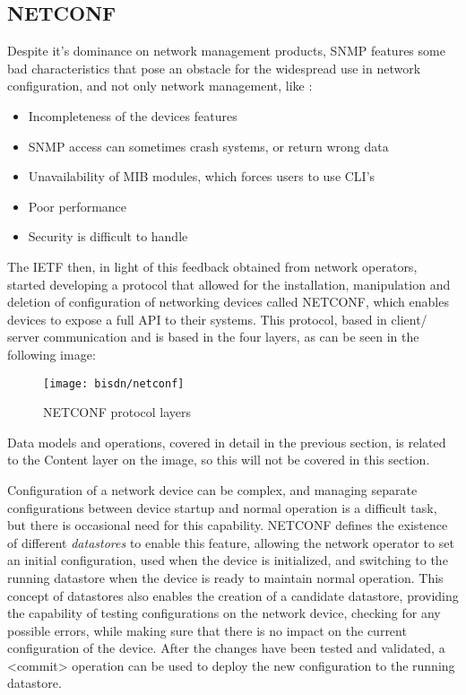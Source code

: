 \subsection {NETCONF} \label {sec:netconf}

Despite it's dominance on network management products, SNMP features some bad characteristics that pose an obstacle for the widespread use in network configuration, and not only network management, like 
\cite {CITE - https://tools.ietf.org/html/rfc3535}: 

\begin {itemize}
    \item Incompleteness of the devices features
    \item SNMP access can sometimes crash systems, or return wrong data
    \item Unavailability of MIB modules, which forces users to use CLI's
    \item Poor performance 
    \item Security is difficult to handle
\end {itemize}

\par The IETF then, in light of this feedback obtained from network operators, started developing a protocol that allowed for the installation, manipulation and deletion of configuration of networking devices called NETCONF, which 
enables devices to expose a full API to their systems. This protocol, based in client/ server communication and is based in the four layers, as can be seen in the following image:

\begin{figure} [!htbp]
    \centering
    \texttt{[image: bisdn/netconf]}
    \caption{NETCONF protocol layers \cite {CITE - Basebox architecture}}
\end{figure}

\par Data models and operations, covered in detail in the previous section, is related to the Content layer on the image, so this will not be covered in this section. 

\par Configuration of a network device can be complex, and managing separate configurations between device startup and normal operation is a difficult task, but there is occasional need for this capability. NETCONF defines the 
existence of different \textit{datastores} to enable this feature, allowing the network operator to set an initial configuration, used when the device is initialized, and switching to the running datastore when the device is ready
to maintain normal operation. This concept of datastores also enables the creation of a candidate datastore, providing the capability of testing configurations on the network device, checking for any possible errors, while making
sure that there is no impact on the current configuration of the device. After the changes have been tested and validated, a <commit> operation can be used to deploy the new configuration to the running datastore.


